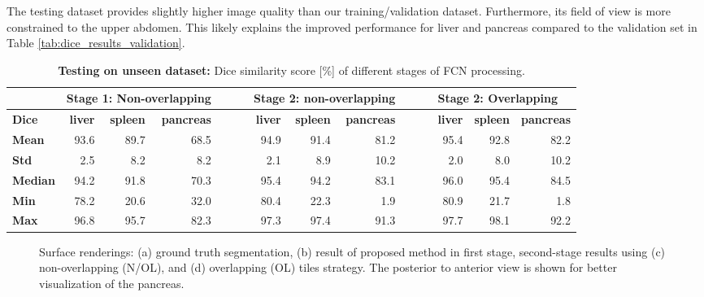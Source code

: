 \documentclass[authoryear]{elsarticle}
\begin{document}
The testing dataset provides slightly higher image quality than our training/validation dataset. Furthermore, its field of view is more constrained to the upper abdomen. This likely explains the improved performance for liver and pancreas compared to the validation set in Table \ref{tab:dice_results_validation}.
\clearpage
\newpage
\begin{table}
	\small
\centering
	\caption{\textbf{Testing on unseen dataset:} Dice similarity score [\%] of different stages of FCN processing.}
	\label{tab:dice_results_testing}
	\begin{tabular}{l|rrr|lrrr|lrrr}
		& \multicolumn{3}{l}{\textbf{Stage 1: Non-overlapping}} &\ \ \ & \multicolumn{3}{l}{\textbf{Stage 2: non-overlapping}} &\ \ \ & \multicolumn{3}{l}{\textbf{Stage 2: Overlapping}} \tabularnewline
		\hline
		\rowcolor[gray]{.9}\textbf{Dice} & \textbf{liver} & \textbf{spleen} & \textbf{pancreas} & \ & \textbf{liver} & \textbf{spleen} & \textbf{pancreas} & \ & \textbf{liver} & \textbf{spleen} & \textbf{pancreas}\tabularnewline
		\hline
		\textbf{Mean} & 93.6 & 89.7 & 68.5 &  & 94.9 & 91.4 & 81.2 &  & 95.4 & 92.8 & 82.2\tabularnewline
		\rowcolor[gray]{.9}\textbf{Std} & 2.5 & 8.2 & 8.2 &  & 2.1 & 8.9 & 10.2 &  & 2.0 & 8.0 & 10.2\tabularnewline
		\textbf{Median} & 94.2 & 91.8 & 70.3 &  & 95.4 & 94.2 & 83.1 &  & 96.0 & 95.4 & 84.5\tabularnewline
		\rowcolor[gray]{.9}\textbf{Min} & 78.2 & 20.6 & 32.0 &  & 80.4 & 22.3 & 1.9 &  & 80.9 & 21.7 & 1.8\tabularnewline
		\textbf{Max} & 96.8 & 95.7 & 82.3 &  & 97.3 & 97.4 & 91.3 &  & 97.7 & 98.1 & 92.2\tabularnewline
		\hline
	\end{tabular}
\end{table}
\clearpage
\newpage
\begin{figure}[htb] \centering
	\hfill
	\hfill
	\hfill
	\caption{Surface renderings: 
		(a) ground truth segmentation, 
		(b) result of proposed method in first stage, second-stage results using (c) non-overlapping (N/OL), and (d) overlapping (OL) tiles strategy. The posterior to anterior view is shown for better visualization of the pancreas.}
	\label{fig:surface_stages}
\end{figure}
\end{document}

